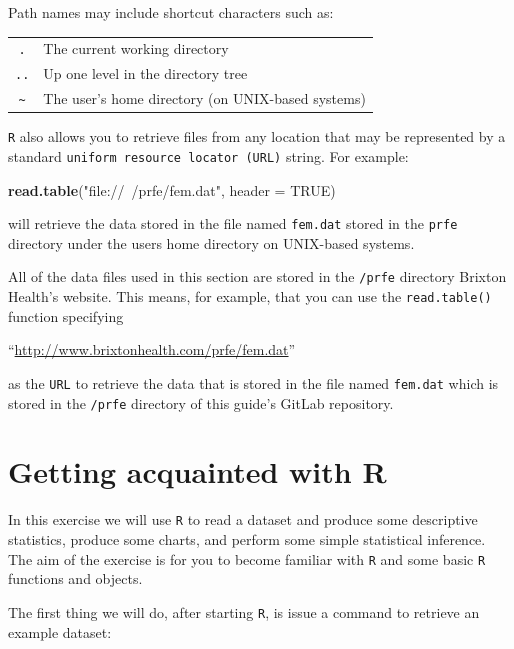 \documentclass[12pt,]{book}
\newenvironment{Shaded}{\begin{snugshade}}{\end{snugshade}}
\newcommand{\KeywordTok}[1]{\textcolor[rgb]{0.13,0.29,0.53}{\textbf{#1}}}
\newcommand{\DataTypeTok}[1]{\textcolor[rgb]{0.13,0.29,0.53}{#1}}
\newcommand{\StringTok}[1]{\textcolor[rgb]{0.31,0.60,0.02}{#1}}
\newcommand{\OtherTok}[1]{\textcolor[rgb]{0.56,0.35,0.01}{#1}}
\newcommand{\NormalTok}[1]{#1}
\theoremstyle{definition}
\theoremstyle{definition}
\theoremstyle{definition}
\theoremstyle{remark}
\begin{document}
Path names may include shortcut characters such as:

\begin{longtable}[]{@{}cl@{}}
\toprule
\texttt{.} & The current working directory\tabularnewline
\texttt{..} & Up one level in the directory tree\tabularnewline
\texttt{\textasciitilde{}} & The user's home directory (on UNIX-based
systems)\tabularnewline
\bottomrule
\end{longtable}

\texttt{R} also allows you to retrieve files from any location that may
be represented by a standard \texttt{uniform\ resource\ locator\ (URL)}
string. For example:

\begin{Shaded}
\begin{Highlighting}[]
\KeywordTok{read.table}\NormalTok{(}\StringTok{"file://~/prfe/fem.dat"}\NormalTok{, }\DataTypeTok{header =} \OtherTok{TRUE}\NormalTok{)}
\end{Highlighting}
\end{Shaded}

will retrieve the data stored in the file named \texttt{fem.dat} stored
in the \texttt{prfe} directory under the users home directory on
UNIX-based systems.

All of the data files used in this section are stored in the
\texttt{/prfe} directory Brixton Health's website. This means, for
example, that you can use the \texttt{read.table()} function specifying

``\url{http://www.brixtonhealth.com/prfe/fem.dat}''

as the \texttt{URL} to retrieve the data that is stored in the file
named \texttt{fem.dat} which is stored in the \texttt{/prfe} directory
of this guide's GitLab repository.

\hypertarget{exercise1}{%
\chapter{Getting acquainted with R}\label{exercise1}}

In this exercise we will use \texttt{R} to read a dataset and produce
some descriptive statistics, produce some charts, and perform some
simple statistical inference. The aim of the exercise is for you to
become familiar with \texttt{R} and some basic \texttt{R} functions and
objects.

The first thing we will do, after starting \texttt{R}, is issue a
command to retrieve an example dataset:
\end{document}
